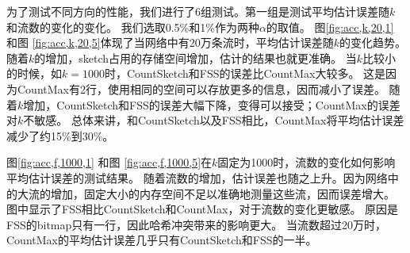 为了测试不同方向的性能，我们进行了6组测试。第一组是测试平均估计误差随$k$和流数的变化的变化。
我们选取0.5\%和1\%作为两种$\alpha$的取值。
图\ref{fig:acc,k,20,1} 和图 \ref{fig:acc,k,20,5}体现了当网络中有20万条流时，平均估计误差随$k$的变化趋势。
随着$k$的增加，sketch占用的存储空间增加，估计的结果也就更准确。
当$k$比较小的时候，如$k=1000$时，CountSketch和FSS的误差比CountMax大较多。
这是因为CountMax有2行，使用相同的空间可以存放更多的信息，因而减小了误差。
随着$k$增加，CountSketch和FSS的误差大幅下降，变得可以接受；CountMax的误差对$k$不敏感。
总体来讲，和CountSketch以及FSS相比，CountMax将平均估计误差减少了约15\%到30\%。

图\ref{fig:acc,f,1000,1} 和图 \ref{fig:acc,f,1000,5}在$k$固定为1000时，流数的变化如何影响平均估计误差的测试结果。
随着流数的增加，估计误差也随之上升。因为网络中的大流的增加，固定大小的内存空间不足以准确地测量这些流，因而误差增大。
图中显示了FSS相比CountSketch和CountMax，对于流数的变化更敏感。
原因是FSS的bitmap只有一行，因此哈希冲突带来的影响更大。
当流数超过20万时，CountMax的平均估计误差几乎只有CountSketch和FSS的一半。


